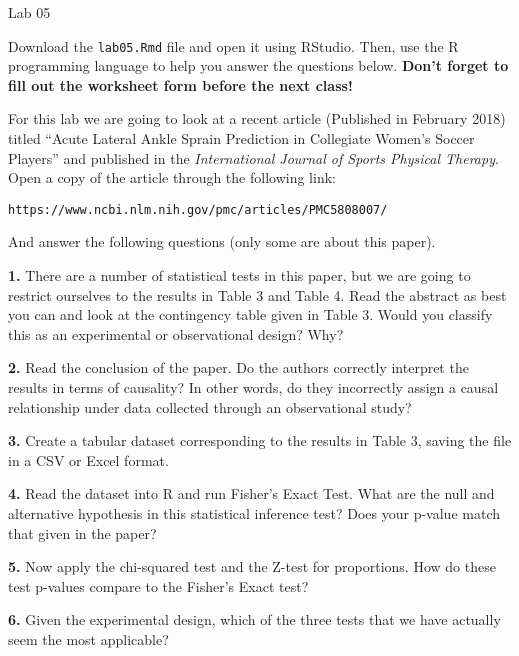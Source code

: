 \documentclass{tufte-handout}
\begin{document}
\justify

{\LARGE Lab 05}

\vspace*{18pt}

Download the \texttt{lab05.Rmd} file and open it using RStudio. Then, use the
R programming language to help you answer the questions below. \textbf{Don't
forget to fill out the worksheet form before the next class!}

For this lab we are going to look at a recent article (Published in
February 2018) titled ``Acute Lateral Ankle Sprain Prediction in Collegiate
Women's Soccer Players'' and published in the \textit{International Journal of
Sports Physical Therapy}. Open a copy of the article through the following
link:
\begin{center}
\texttt{https://www.ncbi.nlm.nih.gov/pmc/articles/PMC5808007/}
\end{center}
And answer the following questions (only some are about this paper).

\vspace*{12pt}

\textbf{1.} There are a number of statistical tests in this paper, but we are
going to restrict ourselves to the results in Table 3 and Table 4. Read the
abstract as best you can and look at the contingency table given in Table 3.
Would you classify this as an experimental or observational design? Why?

\textbf{2.} Read the conclusion of the paper. Do the authors correctly
interpret the results in terms of causality? In other words, do they
incorrectly assign a causal relationship under data collected through an
observational study?

\textbf{3.} Create a tabular dataset corresponding to the results in Table 3,
saving the file in a CSV or Excel format.

\textbf{4.} Read the dataset into R and run Fisher's Exact Test. What are the
null and alternative hypothesis in this statistical inference test? Does your
p-value match that given in the paper?

\textbf{5.} Now apply the chi-squared test and the Z-test for proportions.
How do these test p-values compare to the Fisher's Exact test?

\textbf{6.} Given the experimental design, which of the three tests that we
have actually seem the most applicable?



\end{document}
